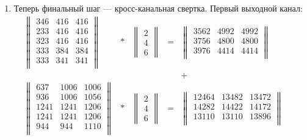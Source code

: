 \documentclass[12pt, a4paper]{extarticle}
\begin{document}
\begin{enumerate}
    \item Теперь финальный шаг --- кросс-канальная свертка. Первый выходной канал:
        \begin{equation}
        \begin{array}{rcccccc}
            \begin{Vmatrix}
                346 & 416 & 416 \\
                233 & 416 & 416 \\
                323 & 416 & 416 \\
                333 & 384 & 384 \\
                333 & 341 & 341 \\
            \end{Vmatrix}
            & \ast & 
            \begin{Vmatrix}
                2 \\ 4 \\ 6
            \end{Vmatrix} 
            & = &
            \begin{Vmatrix}
                3562 & 4992 & 4992 \\
                3756 & 4800 & 4800 \\
                3976 & 4414 & 4414 \\
            \end{Vmatrix} & & \\
            & & & & + & & \\
            \begin{Vmatrix}
                637 & 1006 & 1006 \\
                936 & 1006 & 1056 \\
                1241 & 1241 & 1206 \\
                1241 & 1241 & 1206 \\
                944 & 944 & 1110 \\
            \end{Vmatrix}
            & \ast &
            \begin{Vmatrix}
                2 \\ 4 \\ 6
            \end{Vmatrix} 
            & = & 
            \begin{Vmatrix}
                12464 & 13482 & 13472 \\
                14282 & 14422 & 14172 \\
                13110 & 13110 & 13896 \\

\end{Vmatrix}
\end{array}
\end{equation}
\end{enumerate}
\end{document}
